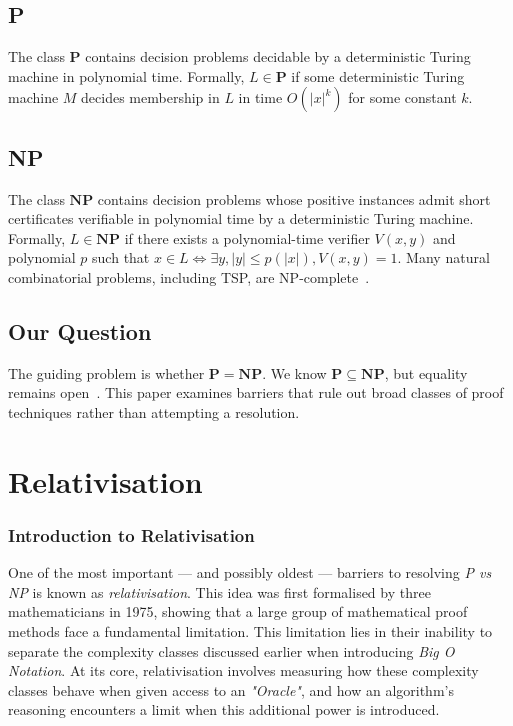 \documentclass[12pt]{report}
\begin{document}
\section{P}
The class $\mathbf{P}$ contains decision problems decidable by a deterministic Turing machine in polynomial time. Formally, $L\in\mathbf{P}$ if some deterministic Turing machine $M$ decides membership in $L$ in time $O(|x|^k)$ for some constant $k$.

\section{NP}
The class $\mathbf{NP}$ contains decision problems whose positive instances admit short certificates verifiable in polynomial time by a deterministic Turing machine. Formally, $L\in\mathbf{NP}$ if there exists a polynomial-time verifier $V(x,y)$ and polynomial $p$ such that $x\in L \iff \exists y, |y|\le p(|x|), V(x,y)=1$. Many natural combinatorial problems, including TSP, are NP-complete~\cite{karp1972,held1962}.

\section{Our Question}
The guiding problem is whether $\mathbf{P}=\mathbf{NP}$. We know $\mathbf{P}\subseteq\mathbf{NP}$, but equality remains open~\cite{arora2009}. This paper examines barriers that rule out broad classes of proof techniques rather than attempting a resolution.

\newpage
\chapter{Relativisation}
\subsection{Introduction to Relativisation}
One of the most important --- and possibly oldest --- barriers to resolving \textit{P vs NP} is known as \textit{relativisation}.
This idea was first formalised by three mathematicians in 1975, showing that a large group of mathematical proof methods face a fundamental limitation.
This limitation lies in their inability to separate the complexity classes discussed earlier when introducing \textit{Big O Notation}.
At its core, relativisation involves measuring how these complexity classes behave when given access to an \textit{"Oracle"}, and how an algorithm's reasoning encounters a limit when this additional power is introduced.
\end{document}
